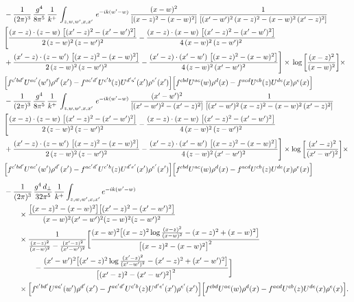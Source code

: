 \documentclass[9pt]{article}
\numberwithin{equation}{section}
\begin{document}
\begin{align}
&   -\frac{1}{(2\pi)^{3}}\, \frac{g^{4}}{8\pi^{5}}\,\frac{1}{k^{+}}\,\int_{z,w,w^{\prime},x,x'}\, e^{-ik(w^{\prime}-w)}\,\frac{(x-w)^{2}}{\left[(x-z)^{2}-(x-w)^{2}\right]}\, \frac{1}{\left[(x'-w')^{2}\, (x-z)^{2} - (x-w)^{2}\, (x'-z)^{2}\right]} \notag \\ & \Bigg[\frac{(x-z)\cdot (z-w)\, \left[(x'-z)^{2}-(x'-w')^{2}\right]}{2\, (z-w)^{2}\, (z-w')^{2}}  - \frac{(x-z)\cdot (x-w)\,\left[(x'-z)^{2}-(x'-w')^{2}\right] }{4\,(x-w)^{2}\,(z-w')^{2}}\notag \\ & +\frac{(x'-z)\cdot (z-w')\, \left[(x-z)^{2}-(x-w)^{2}\right]}{2\, (z-w)^{2}\, (z-w')^{2}}-\frac{(x'-z)\cdot (x'-w')\, \left[(x-z)^{2}-(x-w)^{2}\right]}{4\, (z-w)^{2}\,(x'-w')^{2}}\Bigg]\times\, \log{\left[\frac{(x-z)^{2}}{(x-w)^{2}}\right]}\times\,\notag \\ & \Big[f^{c'bd'}U^{ac'}(w')\rho^{d'}(x')-f^{ac'd'}U^{c'b}(z)U^{d'e'}(x')\rho^{e'}(x')\Big]\Big[f^{cbd}U^{ac}(w)\rho^{d}(x)-f^{acd}U^{cb}(z)U^{de}(x)\rho^{e}(x)\Big] \notag \\
& -\frac{1}{(2\pi)^{3}}\, \frac{g^{4}}{8\pi^{5}}\,\frac{1}{k^{+}}\,\int_{z,w,w^{\prime},x,x'}\, e^{-ik(w^{\prime}-w)}\, \frac{(x'-w')^{2}}{\left[(x'-w')^{2}-(x'-z)^{2}\right]}\, \frac{1}{\left[(x'-w')^{2}\, (x-z)^{2} - (x-w)^{2}\, (x'-z)^{2}\right]}  \notag \\ & \Bigg[\frac{(x-z)\cdot (z-w)\, \left[(x'-z)^{2}-(x'-w')^{2}\right]}{2\, (z-w)^{2}\, (z-w')^{2}}  - \frac{(x-z)\cdot (x-w)\,\left[(x'-z)^{2}-(x'-w')^{2}\right] }{4\,(x-w)^{2}\,(z-w')^{2}}\notag \\ & +\frac{(x'-z)\cdot (z-w')\, \left[(x-z)^{2}-(x-w)^{2}\right]}{2\, (z-w)^{2}\, (z-w')^{2}}-\frac{(x'-z)\cdot (x'-w')\, \left[(x-z)^{2}-(x-w)^{2}\right]}{4\, (z-w)^{2}\,(x'-w')^{2}}\Bigg]\times \log{\left[\frac{(x'-z)^{2}}{(x'-w')^{2}}\right]}\times\notag \\ & \Big[f^{c'bd'}U^{ac'}(w')\rho^{d'}(x')-f^{ac'd'}U^{c'b}(z)U^{d'e'}(x')\rho^{e'}(x')\Big]\Big[f^{cbd}U^{ac}(w)\rho^{d}(x)-f^{acd}U^{cb}(z)U^{de}(x)\rho^{e}(x)\Big]
\end{align}
\begin{align}
&-\frac{1}{(2\pi)^{3}}\,\frac{g^{4}\,d_{\perp}}{32\pi^{5}}\,\frac{1}{k^{+}}\int_{z,w,w',x,x'}e^{-ik(w'-w)}\notag\\&\qquad\times\frac{\big[(x-z)^{2}-(x-w)^{2}\big]\big[(x'-z)^{2}-(x'-w')^{2}\big]}{(x-w)^{2}(x'-w')^{2}(z-w)^{2}(z-w')^{2}}\notag\\&\qquad\times\frac{1}{\frac{(x-z)^{2}}{(x-w)^{2}}-\frac{(x'-z)^{2}}{(x'-w')^{2}}}\bigg[\frac{(x-w)^{2}\big[(x-z)^{2}\log\frac{(x-z)^{2}}{(x-w)^{2}}-(x-z)^{2}+(x-w)^{2}\big]}{\big[(x-z)^{2}-(x-w)^{2}\big]^{2}}\bigg.\notag\\&\qquad\qquad\bigg.-\frac{(x'-w')^{2}\big[(x'-z)^{2}\log\frac{(x'-z)^{2}}{(x'-w')^{2}}-(x'-z)^{2}+(x'-w')^{2}\big]}{\big[(x'-z)^{2}-(x'-w')^{2}\big]^{2}}\bigg]\notag\\&\qquad\times\Big[f^{c'bd'}U^{ac'}(w')\rho^{d'}(x')-f^{ac'd'}U^{c'b}(z)U^{d'e'}(x')\rho^{e'}(x')\Big]\Big[f^{cbd}U^{ac}(w)\rho^{d}(x)-f^{acd}U^{cb}(z)U^{de}(x)\rho^{e}(x)\Big].
\end{align}
\end{document}
